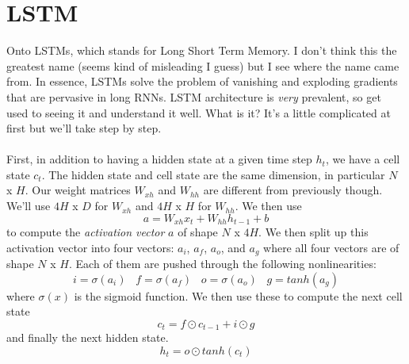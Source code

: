 \documentclass[12pt]{article}
\begin{document}
\section{LSTM}
Onto LSTMs, which stands for Long Short Term Memory. I don't think this the greatest name 
(seems kind of misleading I guess) but I see where the name came from. In essence, LSTMs 
solve the problem of vanishing and exploding gradients that are pervasive in long 
RNNs. LSTM architecture is \emph{very} prevalent, so get used to seeing it and understand 
it well. What is it? It's a little complicated at first but we'll take step by step. 
~\\
~\\
First, in addition to having a hidden state at a given time step $h_t$, we have a cell state 
$c_t$. The hidden state and cell state are the same dimension, in particular $N$ x $H$. Our 
weight matrices $W_{xh}$ and $W_{hh}$ are different from previously though. We'll use 
$4H$ x $D$ for $W_{xh}$ 
and $4H$ x $H$ for $W_{hh}$. We then use 
\begin{equation*}
    a = W_{xh}x_t + W_{hh} h_{t-1} + b
\end{equation*}
to compute the \emph{activation vector} $a$ of shape $N$ x $4H$. We then split up this activation 
vector into four vectors: $a_i$, $a_f$, $a_o$, and $a_g$ where all four vectors are of shape 
$N$ x $H$. Each of them are pushed through the following nonlinearities: 
\begin{equation*}
    i = \sigma(a_i) \; \; \; f = \sigma(a_f) \; \; \; o = \sigma(a_o) \; \; \; g = tanh(a_g)
\end{equation*}
where $\sigma(x)$ is the sigmoid function. We then use these to compute the next cell state
\begin{equation*}
    c_t = f \odot c_{t-1} + i \odot g 
\end{equation*}
and finally the next hidden state. 
\begin{equation*}
    h_t = o \odot tanh(c_t)
\end{equation*}
\end{document}
